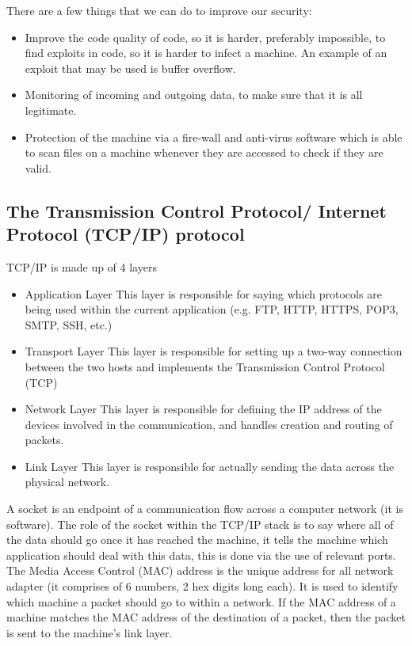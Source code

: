   There are a few things that we can do to improve our security:
  \begin{itemize}
  	\item Improve the code quality of code, so it is harder, preferably impossible, to find exploits in code, so it is harder to infect a machine. An example of an exploit that may be used is buffer overflow.
  	\item Monitoring of incoming and outgoing data, to make sure that it is all legitimate.
  	\item Protection of the machine via a fire-wall and anti-virus software which is able to scan files on a machine whenever they are accessed to check if they are valid.
  \end{itemize}
  
\subsection{The Transmission Control Protocol/ Internet Protocol (TCP/IP) protocol}
  \noindent
  TCP/IP is made up of 4 layers
  \begin{itemize}
  	\item Application Layer
	  	\subitem This layer is responsible for saying which protocols are being used within the current application (e.g. FTP, HTTP, HTTPS, POP3, SMTP, SSH, etc.)
  	\item Transport Layer
	  	\subitem This layer is responsible for setting up a two-way connection between the two hosts and implements the Transmission Control Protocol (TCP)
  	\item Network Layer
	  	\subitem This layer is responsible for defining the IP address of the devices involved in the communication, and handles creation and routing of packets.
  	\item Link Layer
	  	\subitem This layer is responsible for actually sending the data across the physical network.
  \end{itemize}
  
  A socket is an endpoint of a communication flow across a computer network (it is software). The role of the socket within the TCP/IP stack is to say where all of the data should go once it has reached the machine, it tells the machine which application should deal with this data, this is done via the use of relevant ports. The Media Access Control (MAC) address is the unique address for all network adapter (it comprises of 6 numbers, 2 hex digits long each). It is used to identify which machine a packet should go to within a network. If the MAC address of a machine matches the MAC address of the destination of a packet, then the packet is sent to the machine's link layer.
  
